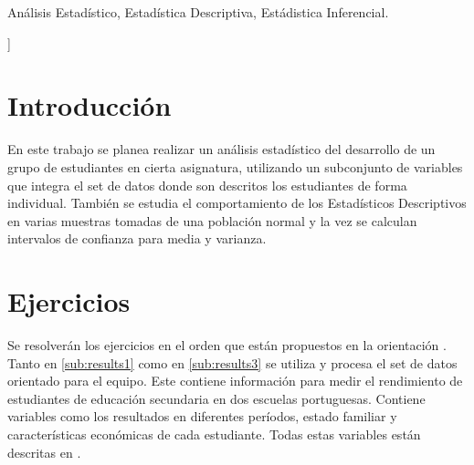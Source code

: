 \documentclass[a4paper,10pt,twocolumn]{article}
\begin{document}
\begin{topics}
	Análisis Estadístico, Estadística Descriptiva, Estádistica Inferencial.
\end{topics}


\vspace{0.8cm}
]



\section{Introducción}\label{sec:intro}
  En este trabajo se planea realizar un análisis estadístico del desarrollo de un grupo de estudiantes en cierta asignatura, utilizando un subconjunto de variables que integra el set de datos donde son descritos los estudiantes de forma individual. También se estudia el comportamiento de los Estadísticos Descriptivos en varias muestras tomadas de una población normal y la vez se calculan intervalos de confianza para media y varianza.



\section{Ejercicios}\label{sec:dev}
  Se resolverán los ejercicios en el orden que están propuestos en la orientación \cite{1}.
  \\
  Tanto en \ref{sub:results1} como en \ref{sub:results3} se utiliza y procesa el set de datos orientado para el equipo. Este contiene información para medir el rendimiento de estudiantes de educación secundaria en dos escuelas portuguesas. Contiene variables como
  los resultados en diferentes períodos, estado familiar y características económicas de cada estudiante. Todas estas variables están descritas en \cite{artículo original}.
  
\end{document}
